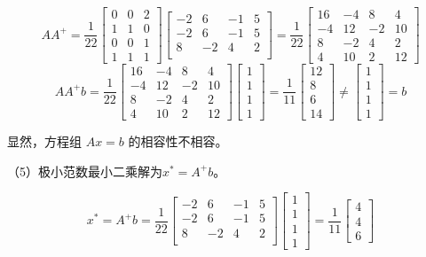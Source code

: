 \documentclass[11pt, a4paper]{article}
\begin{document}
$$AA^+ = \displaystyle\frac{1}{22}
\begin{bmatrix} 0 & 0 & 2 \\ 1 & 1 & 0 \\ 0 & 0 & 1 \\ 1 & 1 & 1 \end{bmatrix}
\begin{bmatrix}
-2&6&-1&5\\
-2&6&-1&5\\
8&-2&4&2\\
\end{bmatrix}=\displaystyle\frac{1}{22}
\begin{bmatrix}
16&-4&8&4\\
-4&12&-2&10\\
8&-2&4&2\\
4&10&2&12
\end{bmatrix}
$$
$$AA^+b=\displaystyle\frac{1}{22}
\begin{bmatrix}
16&-4&8&4\\
-4&12&-2&10\\
8&-2&4&2\\
4&10&2&12
\end{bmatrix}
\begin{bmatrix} 1 \\ 1 \\ 1 \\ 1 \end{bmatrix}
=\displaystyle\frac{1}{11}\begin{bmatrix}12\\8\\6\\14\end{bmatrix}\neq\begin{bmatrix}1\\1\\1\\1\end{bmatrix}=b$$

显然，方程组 \( Ax = b \) 的相容性不相容。

（5）极小范数最小二乘解为$x^*=A^+b$。

$$x^*=A^+b=\displaystyle\frac{1}{22}
\begin{bmatrix}
-2&6&-1&5\\
-2&6&-1&5\\
8&-2&4&2\\
\end{bmatrix}
\begin{bmatrix}1\\1\\1\\1\end{bmatrix}
=\displaystyle\frac{1}{11}
\begin{bmatrix}4\\4\\6\end{bmatrix}$$
\end{document}
